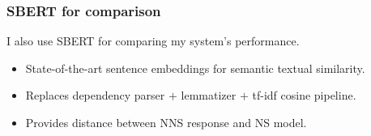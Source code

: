 \documentclass[handout,xcolor={dvipsnames}]{beamer}
\newcommand{\param}[1]{\texttt{#1}}
\begin{document}
\begin{frame}
\frametitle{SBERT for comparison}
I also use SBERT for comparing my system's performance.
\pause
\vspace{.3em}
\begin{itemize}
\pause
\item State-of-the-art sentence embeddings for semantic textual similarity.
\vspace{.3em}
\vspace{-1.2em}
\pause
\item Replaces dependency parser $+$ lemmatizer $+$ tf-idf cosine pipeline. 
\vspace{.3em}
\pause
\item Provides distance between NNS response and NS model.
\end{itemize}
\end{frame}
\end{document}
